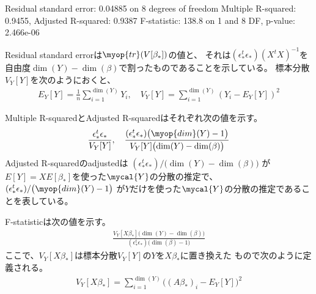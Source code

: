 \begin{itemize}
		\begin{cprog}
			Residual standard error: 0.04885 on 8 degrees of freedom
			Multiple R-squared: 0.9455,     Adjusted R-squared: 0.9387 
			F-statistic: 138.8 on 1 and 8 DF,  p-value: 2.466e-06
		\end{cprog}
		Residual standard errorは$\myop{tr}(V[\beta_*])$の値と、
		それは$(\epsilon_*^t\epsilon_*)(X^tX)^{-1}$を
		自由度$\dim(Y)-\dim(\beta)$で割ったものであることを示している。
		標本分散$V_Y[Y]$を次のようにおくと、
		\begin{equation*}\begin{split} %
			E_Y[Y] = \frac{1}{n}\sum_{i=1}^{\dim(Y)}Y_i ,\quad
			V_Y[Y] = \sum_{i=1}^{\dim(Y)}(Y_i - E_Y[Y])^2
		\end{split}\end{equation*} %

		Multiple R-squaredとAdjusted R-squaredはそれぞれ次の値を示す。
		\begin{equation*}\begin{split} %
			\frac{\epsilon_*^t\epsilon_*}{V_Y[Y]},\quad
			\frac{(\epsilon_*^t\epsilon_*)\bigl(\myop{dim}(Y)-1\bigr)}
				{V_Y[Y]\bigl(\dim(Y)-\dim(\beta)\bigr)}
		\end{split}\end{equation*} %
		Adjusted R-squaredのadjustedは
		$(\epsilon_*^t\epsilon_*)/\bigl(\dim(Y)-\dim(\beta)\bigr)$
		が$E[Y]=XE[\beta_*]$を使った$\mycal{Y}$の分散の推定で、
		$(\epsilon_*^t\epsilon_*)/\bigl(\myop{dim}(Y)-1\bigr)$
		が$Y$だけを使った$\mycal{Y}$の分散の推定であることを表している。

		F-statisticは次の値を示す。
		\begin{equation*}\begin{split} %
			\frac{V_Y[X\beta_*]\bigl(\dim(Y)-\dim(\beta)\bigr)}
				{(\epsilon_*^t\epsilon_*)\bigl(\dim(\beta)-1\bigr)}
		\end{split}\end{equation*} %
		ここで、$V_Y[X\beta_*]$は標本分散$V_Y[Y]$の$Y$を$X\beta_*$に置き換えた
		もので次のように定義される。
		\begin{equation*}\begin{split} %
			V_Y[X\beta_*] = \sum_{i=1}^{\dim(Y)}\bigl((A\beta_*)_i - E_Y[Y]\bigr)^2
		\end{split}\end{equation*} %
	\end{itemize} %

